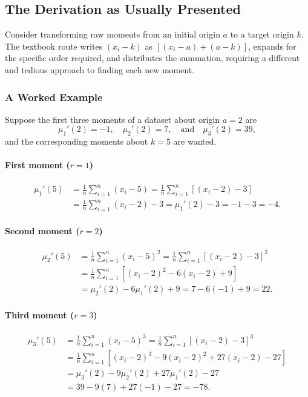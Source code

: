 \documentclass[
  12pt]{article}
\begin{document}
\subsection{The Derivation as Usually Presented}

Consider transforming raw moments from an initial origin $a$ to a target origin $k$. The textbook route writes $(x_i - k)$ as $[(x_i - a) + (a - k)]$, expands for the specific order required, and distributes the summation, requiring a different and tedious approach to finding each new moment. 

\subsubsection{A Worked Example}

Suppose the first three moments of a dataset about origin $a = 2$ are
\[
\mu_1'(2) = -1, \quad \mu_2'(2) = 7, \quad \text{and} \quad \mu_3'(2) = 39,
\]
and the corresponding moments about $k = 5$ are wanted.

\paragraph{First moment ($r = 1$)}
\begin{align*}
\mu_1'(5) &= \frac{1}{n} \sum_{i=1}^n (x_i - 5)
           = \frac{1}{n} \sum_{i=1}^n \left[(x_i - 2) - 3\right] \\
          &= \frac{1}{n} \sum_{i=1}^n (x_i - 2) - 3
           = \mu_1'(2) - 3 = -1 - 3 = -4.
\end{align*}

\paragraph{Second moment ($r = 2$)}
\begin{align*}
\mu_2'(5) &= \frac{1}{n} \sum_{i=1}^n (x_i - 5)^2
           = \frac{1}{n} \sum_{i=1}^n \left[(x_i - 2) - 3\right]^2 \\
          &= \frac{1}{n} \sum_{i=1}^n \left[(x_i - 2)^2 - 6(x_i - 2) + 9\right] \\
          &= \mu_2'(2) - 6\mu_1'(2) + 9
           = 7 - 6(-1) + 9 = 22.
\end{align*}

\paragraph{Third moment ($r = 3$)}
\begin{align*}
\mu_3'(5) &= \frac{1}{n} \sum_{i=1}^n (x_i - 5)^3
           = \frac{1}{n} \sum_{i=1}^n \left[(x_i - 2) - 3\right]^3 \\
          &= \frac{1}{n} \sum_{i=1}^n \left[(x_i - 2)^3 - 9(x_i - 2)^2 + 27(x_i - 2) - 27\right] \\
          &= \mu_3'(2) - 9\mu_2'(2) + 27\mu_1'(2) - 27 \\
          &= 39 - 9(7) + 27(-1) - 27 = -78.
\end{align*}
\end{document}
